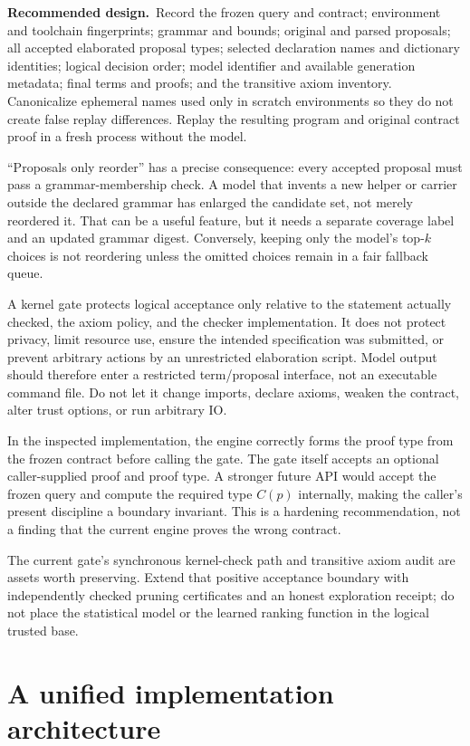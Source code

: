 \documentclass[11pt,a4paper]{article}
\newcommand{\proposal}{\noindent\textbf{Recommended design.}\ }
\theoremstyle{remark}
\begin{document}
\proposal Record the frozen query and contract; environment and toolchain fingerprints; grammar and bounds; original and parsed proposals; all accepted elaborated proposal types; selected declaration names and dictionary identities; logical decision order; model identifier and available generation metadata; final terms and proofs; and the transitive axiom inventory. Canonicalize ephemeral names used only in scratch environments so they do not create false replay differences. Replay the resulting program and original contract proof in a fresh process without the model.

``Proposals only reorder'' has a precise consequence: every accepted proposal must pass a grammar-membership check. A model that invents a new helper or carrier outside the declared grammar has enlarged the candidate set, not merely reordered it. That can be a useful feature, but it needs a separate coverage label and an updated grammar digest. Conversely, keeping only the model's top-$k$ choices is not reordering unless the omitted choices remain in a fair fallback queue.

A kernel gate protects logical acceptance only relative to the statement actually checked, the axiom policy, and the checker implementation. It does not protect privacy, limit resource use, ensure the intended specification was submitted, or prevent arbitrary actions by an unrestricted elaboration script. Model output should therefore enter a restricted term/proposal interface, not an executable command file. Do not let it change imports, declare axioms, weaken the contract, alter trust options, or run arbitrary IO.

In the inspected implementation, the engine correctly forms the proof type from the frozen contract before calling the gate. The gate itself accepts an optional caller-supplied proof and proof type. A stronger future API would accept the frozen query and compute the required type $C(p)$ internally, making the caller's present discipline a boundary invariant. This is a hardening recommendation, not a finding that the current engine proves the wrong contract.~\cite{engine,gate}

The current gate's synchronous kernel-check path and transitive axiom audit are assets worth preserving. Extend that positive acceptance boundary with independently checked pruning certificates and an honest exploration receipt; do not place the statistical model or the learned ranking function in the logical trusted base.

\section{A unified implementation architecture}\label{sec:architecture}
\end{document}
